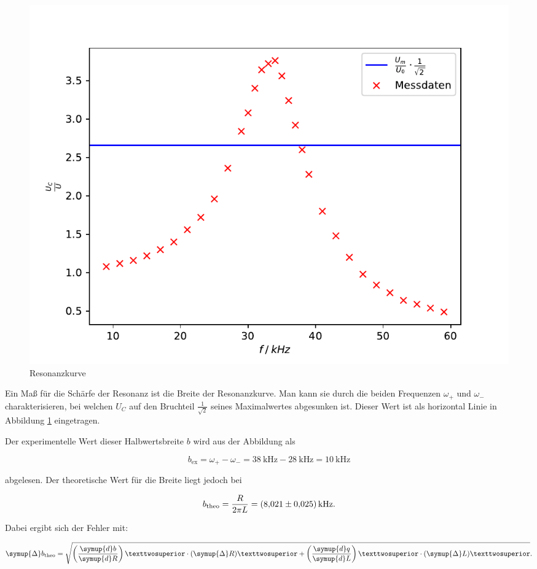 \begin{figure}
  \centering
  \includegraphics[scale=0.8]{content/plot2.pdf}
  \caption{Resonanzkurve}
  \label{fig:resonanz}
\end{figure}


Ein Maß für die Schärfe der Resonanz ist die Breite der Resonanzkurve. 
Man kann sie durch die beiden Frequenzen $\omega _+$ und $\omega _-$
charakterisieren, bei welchen $U_C$ auf den Bruchteil $\frac{1}{\sqrt{2}}$
seines Maximalwertes abgesunken ist. Dieser Wert ist als horizontal Linie
in Abbildung \ref{fig:resonanz} eingetragen. 

Der experimentelle Wert dieser Halbwertsbreite $b$ wird aus der Abbildung als 

\begin{equation*}
b_\text{ex} = \omega _+ - \omega _- = \SI{38}{\kilo\hertz} - \SI{28}{\kilo\hertz} = \SI{10}{\kilo\hertz} 
\end{equation*}

abgelesen.
Der theoretische Wert für die Breite liegt jedoch bei 

\begin{equation*}
b_\text{theo} = \frac{R}{2\pi L} = \SI{8.021+-0.025}{\kilo\hertz}.
\end{equation*}

Dabei ergibt sich der Fehler mit: 

\begin{equation*}
\symup{\Delta}b_\text{theo} = \sqrt{\left(\frac{\symup{d}b}{\symup{d}R}\right)²\cdot(\symup{\Delta}R)² +
\left(\frac{\symup{d}q}{\symup{d}L}\right)²\cdot(\symup{\Delta}L)²}.
\end{equation*}

